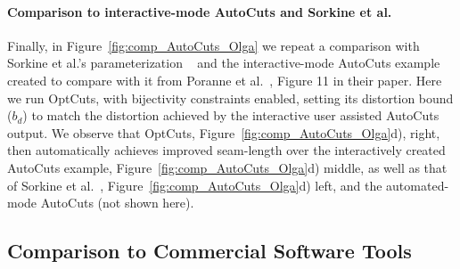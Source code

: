 


\paragraph{Comparison to interactive-mode AutoCuts and Sorkine et al.\ }
Finally, in Figure\ \ref{fig:comp_AutoCuts_Olga} we repeat a comparison with Sorkine et al.'s parameterization \  and the interactive-mode AutoCuts example created to compare with it from Poranne et al.\ , Figure 11 in their paper. 
Here we run OptCuts, with bijectivity constraints enabled, setting its distortion bound ($b_d$) to match the distortion achieved by the interactive user assisted AutoCuts output. We observe that OptCuts, Figure\ \ref{fig:comp_AutoCuts_Olga}d), right, then automatically achieves improved seam-length over the interactively created AutoCuts example, Figure\ \ref{fig:comp_AutoCuts_Olga}d) middle, as well as that of Sorkine et al.\ , Figure\ \ref{fig:comp_AutoCuts_Olga}d) left, and the automated-mode AutoCuts (not shown here).

\subsection{Comparison to Commercial Software Tools}
 
